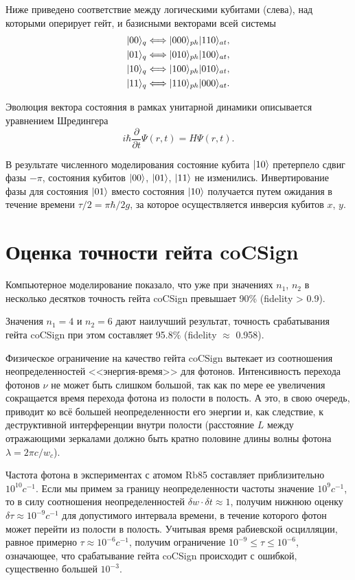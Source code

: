 Ниже приведено соответствие между логическими кубитами (слева), над которыми оперирует гейт, и базисными векторами всей системы
\begin{align*}
|00\rangle_{q} \Longleftrightarrow |000\rangle_{ph}|110\rangle_{at},\\
|01\rangle_{q} \Longleftrightarrow |010\rangle_{ph}|100\rangle_{at},\\
|10\rangle_{q} \Longleftrightarrow |100\rangle_{ph}|010\rangle_{at},\\
|11\rangle_{q} \Longleftrightarrow |110\rangle_{ph}|000\rangle_{at}.
\end{align*}

Эволюция вектора состояния в рамках унитарной динамики описывается уравнением Шредингера
\begin{equation}\label{schrodinger2}
	i\hbar\frac{\partial}{\partial t}\Psi(r,t) = H\Psi(r,t).
\end{equation}

В результате численного моделирования состояние кубита $|10\rangle$ претерпело сдвиг фазы $-\pi$, состояния кубитов $|00\rangle$, $|01\rangle$, $|11\rangle$ не изменились. Инвертирование фазы для состояния $|01\rangle$ вместо состояния $|10\rangle$ получается путем ожидания в течение времени $\tau/2 = \pi\hbar/2g$, за которое осуществляется инверсия кубитов $x$, $y$.

\section{Оценка точности гейта coCSign}

Компьютерное моделирование показало, что уже при значениях $n_{1}$, $n_{2}$ в несколько десятков точность гейта coCSign превышает 90\% (fidelity > 0.9).

Значения $n_{1} = 4$ и $n_{2} = 6$ дают наилучший результат, точность срабатывания гейта coCSign при этом составляет 95.8\% (fidelity $\approx$ 0.958).

Физическое ограничение на качество гейта $\text{coCSign}$ вытекает из соотношения неопределенностей <<энергия-время>> для фотонов. Интенсивность перехода фотонов $\nu$ не может быть слишком большой, так как по мере ее увеличения сокращается время перехода фотона из полости в полость. А это, в свою очередь, приводит ко всё большей неопределенности его энергии и, как следствие, к деструктивной интерференции внутри полости (расстояние $L$ между отражающими зеркалами должно быть кратно половине длины волны фотона $\lambda = 2\pi c/w_{c}$).

Частота фотона в экспериментах с атомом Rb85 составляет приблизительно $10^{10} c^{-1}$. Если мы примем за границу неопределенности частоты значение $10^{9} c^{-1}$, то в силу соотношения неопределенностей $\delta w \cdot \delta t \approx 1$, получим нижнюю оценку $\delta\tau \approx 10^{-9} c^{-1}$ для допустимого интервала времени, в течение которого фотон может перейти из полости в полость. Учитывая время рабиевской осцилляции, равное примерно $\tau \approx 10^{-6} c^{-1}$, получим ограничение $10^{-9} \le \tau \le 10^{-6}$, означающее, что срабатывание гейта coCSign происходит с ошибкой, существенно большей $10^{-3}$.

